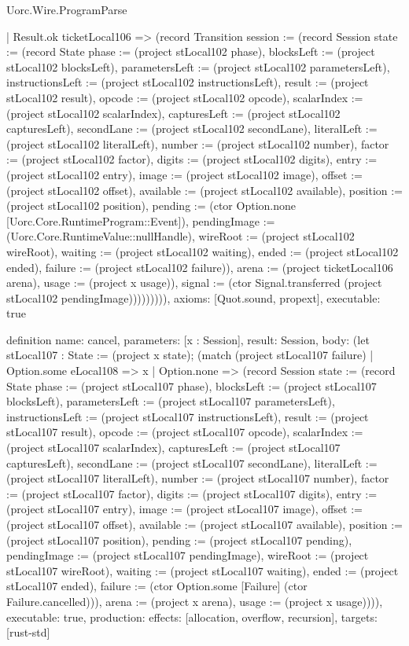 \begin{lexlean}{Uorc.Wire.ProgramParse}
\begin{semanticmodule}
{          | Result.ok ticketLocal106 => (record Transition {session := (record Session {state := (record State {phase := (project stLocal102 phase), blocksLeft := (project stLocal102 blocksLeft), parametersLeft := (project stLocal102 parametersLeft), instructionsLeft := (project stLocal102 instructionsLeft), result := (project stLocal102 result), opcode := (project stLocal102 opcode), scalarIndex := (project stLocal102 scalarIndex), capturesLeft := (project stLocal102 capturesLeft), secondLane := (project stLocal102 secondLane), literalLeft := (project stLocal102 literalLeft), number := (project stLocal102 number), factor := (project stLocal102 factor), digits := (project stLocal102 digits), entry := (project stLocal102 entry), image := (project stLocal102 image), offset := (project stLocal102 offset), available := (project stLocal102 available), position := (project stLocal102 position), pending := (ctor Option.none [Uorc.Core.RuntimeProgram::Event]), pendingImage := (Uorc.Core.RuntimeValue::nullHandle), wireRoot := (project stLocal102 wireRoot), waiting := (project stLocal102 waiting), ended := (project stLocal102 ended), failure := (project stLocal102 failure)}), arena := (project ticketLocal106 arena), usage := (project x usage)}), signal := (ctor Signal.transferred (project stLocal102 pendingImage))}))))))),
  axioms: [Quot.sound, propext],
  executable: true
}

definition{
  name: cancel,
  parameters: [x : Session],
  result: Session,
  body: (let stLocal107 : State := (project x state); (match (project stLocal107 failure)
    | Option.some eLocal108 => x
    | Option.none => (record Session {state := (record State {phase := (project stLocal107 phase), blocksLeft := (project stLocal107 blocksLeft), parametersLeft := (project stLocal107 parametersLeft), instructionsLeft := (project stLocal107 instructionsLeft), result := (project stLocal107 result), opcode := (project stLocal107 opcode), scalarIndex := (project stLocal107 scalarIndex), capturesLeft := (project stLocal107 capturesLeft), secondLane := (project stLocal107 secondLane), literalLeft := (project stLocal107 literalLeft), number := (project stLocal107 number), factor := (project stLocal107 factor), digits := (project stLocal107 digits), entry := (project stLocal107 entry), image := (project stLocal107 image), offset := (project stLocal107 offset), available := (project stLocal107 available), position := (project stLocal107 position), pending := (project stLocal107 pending), pendingImage := (project stLocal107 pendingImage), wireRoot := (project stLocal107 wireRoot), waiting := (project stLocal107 waiting), ended := (project stLocal107 ended), failure := (ctor Option.some [Failure] (ctor Failure.cancelled))}), arena := (project x arena), usage := (project x usage)}))),
  executable: true,
  production: {effects: [allocation, overflow, recursion], targets: [rust-std]}
}


\end{semanticmodule}
\end{lexlean}
